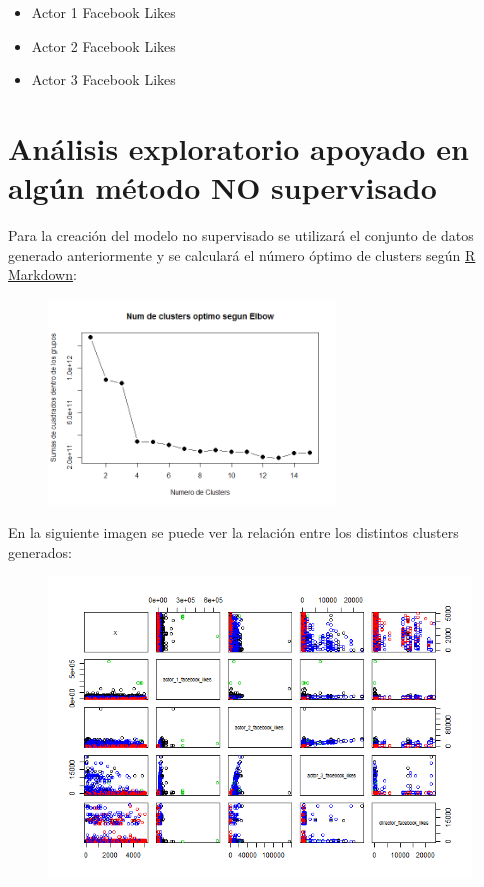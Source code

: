 \documentclass{article}
\begin{document}
\begin{itemize}
  \item Actor 1 Facebook Likes 
  \item Actor 2 Facebook Likes 
  \item Actor 3 Facebook Likes 
\end{itemize}

\clearpage

\section{Análisis exploratorio apoyado en algún método NO supervisado}

Para la creación del modelo no supervisado se utilizará el conjunto de datos generado anteriormente y se calculará el número óptimo de clusters según \href{https://github.com/pozueco/proyecto_fin_de_master/blob/master/model_no_supervised.md}{R Markdown}:

\begin{figure}[h]
\centering
\includegraphics[width=3in,clip,keepaspectratio]{./model_no_supervised_files/figure-markdown_github/unnamed-chunk-2-1}
\end{figure}

En la siguiente imagen se puede ver la relación entre los distintos clusters generados:

\begin{figure}[h]
\centering
\includegraphics[width=4.5in,clip,keepaspectratio]{./model_no_supervised_files/figure-markdown_github/unnamed-chunk-2-2}
\end{figure}
\end{document}
